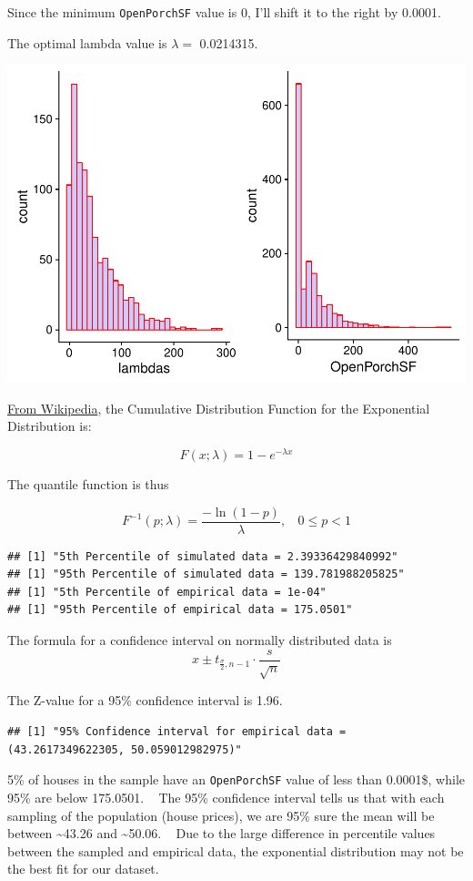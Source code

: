 \documentclass[]{article}
\begin{document}
Since the minimum \texttt{OpenPorchSF} value is 0, I'll shift it to the
right by 0.0001.

The optimal lambda value is \(\lambda =\) 0.0214315.

\includegraphics{DATA_605_Final_Exam_files/figure-latex/lambda-plot-1.pdf}

\href{https://en.wikipedia.org/wiki/Exponential_distribution\#Quantiles}{From
Wikipedia}, the Cumulative Distribution Function for the Exponential
Distribution is:

\[
F(x;\lambda) = 1 - e^{-\lambda x}
\]

The quantile function is thus

\[
F^{-1}(p;\lambda) = \frac{-\ln(1 - p)}{\lambda}, \ \ \ \ 0 \leq p < 1
\]

\begin{verbatim}
## [1] "5th Percentile of simulated data = 2.39336429840992"
## [1] "95th Percentile of simulated data = 139.781988205825"
## [1] "5th Percentile of empirical data = 1e-04"
## [1] "95th Percentile of empirical data = 175.0501"
\end{verbatim}

The formula for a confidence interval on normally distributed data is \[
x \pm t_{\frac{\sigma}{2}, n-1}\cdot \frac{s}{\sqrt{n}}
\]

The Z-value for a 95\% confidence interval is 1.96.

\begin{verbatim}
## [1] "95% Confidence interval for empirical data = (43.2617349622305, 50.059012982975)"
\end{verbatim}

5\% of houses in the sample have an \texttt{OpenPorchSF} value of less
than 0.0001\$, while 95\% are below 175.0501. ~ The 95\% confidence
interval tells us that with each sampling of the population (house
prices), we are 95\% sure the mean will be between
\textasciitilde{}43.26 and \textasciitilde{}50.06. ~ Due to the large
difference in percentile values between the sampled and empirical data,
the exponential distribution may not be the best fit for our dataset.
\end{document}
